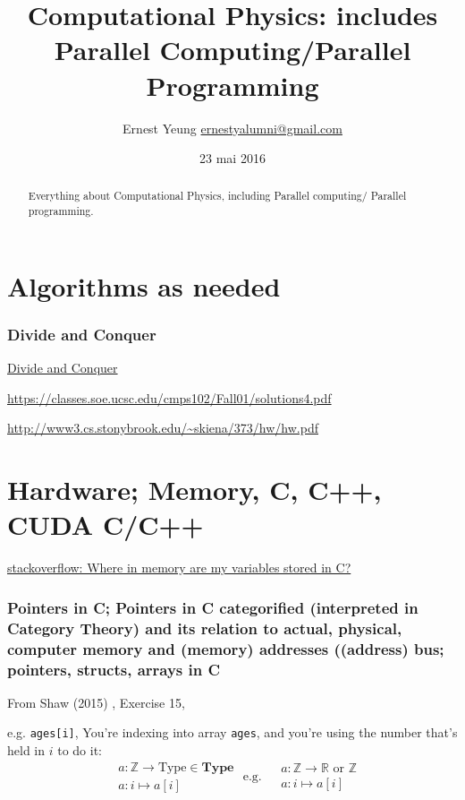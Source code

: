 \documentclass[10pt]{amsart}
\title{Computational Physics: includes Parallel Computing/Parallel Programming}
\author{Ernest Yeung \href{mailto:ernestyalumni@gmail.com}{ernestyalumni@gmail.com}}
\date{23 mai 2016}
\begin{document}

\maketitle

\tableofcontents


\begin{multicols*}{2}

\begin{abstract}
Everything about Computational Physics, including Parallel computing/ Parallel programming.  
\end{abstract}

\part{Algorithms as needed}

\section{Divide and Conquer}

\href{https://people.eecs.berkeley.edu/~vazirani/algorithms/chap2.pdf}{Divide and Conquer}

\url{https://classes.soe.ucsc.edu/cmps102/Fall01/solutions4.pdf}

\url{http://www3.cs.stonybrook.edu/~skiena/373/hw/hw.pdf}

\part{Hardware; Memory, C, C++, CUDA C/C++}

\href{https://stackoverflow.com/questions/14588767/where-in-memory-are-my-variables-stored-in-c}{stackoverflow: Where in memory are my variables stored in C?}

\section{Pointers in C; Pointers in C categorified (interpreted in Category Theory) and its relation to actual, physical, computer memory and (memory) addresses ((address) bus; pointers, structs, arrays in C}

From Shaw (2015) \cite{Shaw2015}, Exercise 15, 

e.g. \verb|ages[i]|, You're indexing into array \verb|ages|, and you're using the number that's held in $i$ to do it:  
\[
\begin{aligned}
& a : \mathbb{Z} \to \text{Type} \in \textbf{Type}  \\
& a: i \mapsto a[i]
\end{aligned} \text{ e.g. } 
\begin{aligned}
& a: \mathbb{Z} \to \mathbb{R} \text{ or } \mathbb{Z}  \\
& a:i \mapsto a[i]
\end{aligned}
\]


\end{multicols*}
\end{document}
